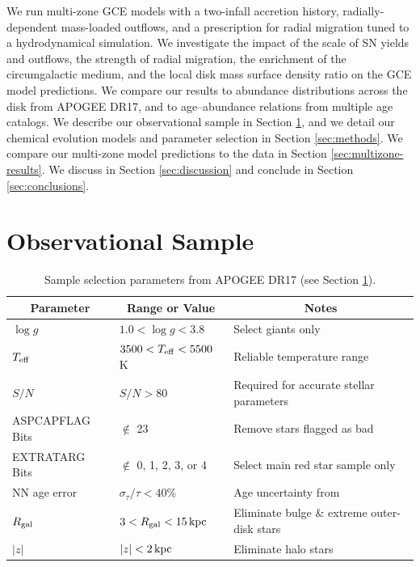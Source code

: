 \documentclass[twocolumn,twocolappendix,linenumbers]{aastex631}
\newcommand{\todo}[1]{{\color{red}#1}}
\begin{document}
We run multi-zone GCE models with a two-infall accretion history, radially-dependent mass-loaded outflows, and a prescription for radial migration tuned to a hydrodynamical simulation. We investigate the impact of the scale of SN yields and outflows, the strength of radial migration, the enrichment of the circumgalactic medium, and the local disk mass surface density ratio on the GCE model predictions. We compare our results to abundance distributions across the disk from APOGEE DR17, and to age--abundance relations from multiple age catalogs. We describe our observational sample in Section \ref{sec:observational-sample}, and we detail our chemical evolution models and parameter selection in Section \ref{sec:methods}. We compare our multi-zone model predictions to the data in Section \ref{sec:multizone-results}. We discuss in Section \ref{sec:discussion} and conclude in Section \ref{sec:conclusions}.

\section{Observational Sample}
\label{sec:observational-sample}

\begin{table}
    \centering
    \caption{Sample selection parameters from APOGEE DR17 (see Section \ref{sec:observational-sample}).}
    \label{tab:sample}
    \begin{tabular}{lll}
        \hline\hline
        \multicolumn{1}{c}{Parameter} & \multicolumn{1}{c}{Range or Value} & \multicolumn{1}{c}{Notes} \\
        \hline
        $\log g$            & $1.0 < \log g < 3.8$          & Select giants only \\
        $T_{\rm eff}$       & $3500 < T_{\rm eff} < 5500$ K & Reliable temperature range \\
        $S/N$               & $S/N > 80$                    & Required for accurate stellar parameters \\
        ASPCAPFLAG Bits     & $\notin$ 23                   & Remove stars flagged as bad \\
        EXTRATARG Bits      & $\notin$ 0, 1, 2, 3, or 4     & Select main red star sample only \\
        NN age error        & $\sigma_\tau/\tau < 40\%$     & Age uncertainty from \citet{leung_variational_2023} \\
        $R_{\rm gal}$     & $3 < R_{\rm gal} < 15\,{\rm kpc}$    & Eliminate bulge \& extreme outer-disk stars \\
        $|z|$               & $|z| < 2\,{\rm kpc}$                 & Eliminate halo stars \\
        \hline
    \end{tabular}
\end{table}
\end{document}
